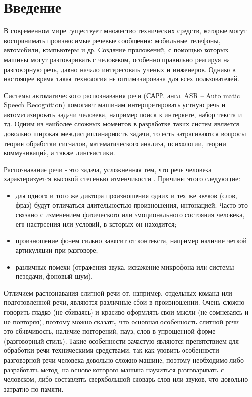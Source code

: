 \chapter*{Введение}
\setcounter{page}{2}

В современном мире существует множество технических средств, которые могут воспринимать произносимые речевые сообщения: мобильные телефоны, автомобили, компьютеры и др. Создание приложений, с помощью которых машины могут разговаривать с человеком, особенно правильно реагируя на разговорную речь, давно начало интересовать ученых и инженеров. Однако в настоящее время такая технология не оптимизирована для всех пользователей.

Системы автоматического распознавания речи (САРР, англ. ASR -- Auto matic Speech Recognition) помогают машинам интерпретировать устную речь и автоматизировать задачи человека, например поиск в интернете, набор текста и тд. Одним из наиболее сложных моментов в разработке таких систем является довольно широкая междисциплинарность задачи, то есть затрагиваются вопросы теории обработки сигналов, математического анализа, психологии, теории коммуникаций, а также лингвистики.
 
Распознавание речи - это задача, усложненная тем, что речь человека характеризуется высокой степенью изменчивости \cite{spr}. Причины этого следующие:
\begin{itemize}
	\item для одного и того же диктора произношения одних и тех же звуков (слов, фраз) будут отличаться длительностью произношения, интонацией. Часто это связано с изменением физического или эмоционального состояния человека, его настроения или условий, в которых он находится;
	\item произношение фонем сильно зависит от контекста, например наличие четкой артикуляции при разговоре;
	\item различные помехи (отражения звука, искажение микрофона или системы передачи, фоновый шум).
\end{itemize}

Отличием распознавания слитной речи от, например, отдельных команд или подготовленной речи, являются различные сбои в произношении. Очень сложно говорить гладко (не сбиваясь) и красиво оформлять свои мысли (не сомневаясь и не повторяя), поэтому можно сказать, что основная особенность слитной речи - это сбивчивость, наличие повторений, пауз, слов в упрощенной форме (разговорный стиль). Такие особенности зачастую являются препятствием для обработки речи техническими средствами, так как уловить особенности разговорной речи человека довольно сложно машине, поэтому необходимо либо разработать метод, на основе которого машина научиться разговаривать с человеком, либо составлять сверхбольшой словарь слов или звуков, что довольно затратно по памяти.

